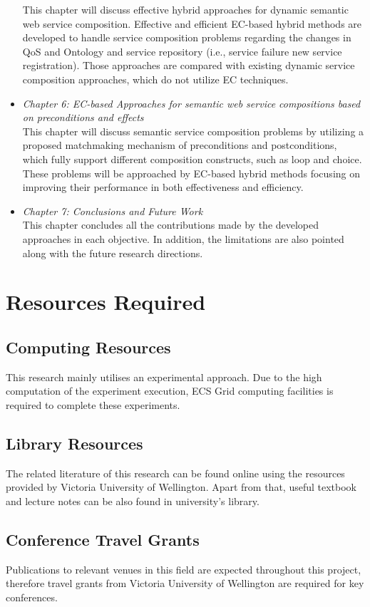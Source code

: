 \begin{itemize}
This chapter will discuss effective hybrid approaches for dynamic semantic web service composition. Effective and efficient EC-based hybrid methods are developed to handle service composition problems regarding the changes in QoS and Ontology and service repository (i.e., service failure new service registration). Those approaches are compared with existing dynamic service composition approaches, which do not utilize EC techniques.
 \item \textit{Chapter 6: EC-based Approaches for semantic web service compositions based on preconditions and effects}\\
This chapter will discuss semantic service composition problems by utilizing a proposed matchmaking mechanism of preconditions and postconditions, which fully support different composition constructs, such as loop and choice. These problems will be approached by EC-based hybrid methods focusing on improving their performance in both effectiveness and efficiency.
 \item \textit{Chapter 7: Conclusions and Future Work}\\
This chapter concludes all the contributions made by the developed approaches in each objective. In addition, the limitations are also pointed along with the future research directions.
\end{itemize}


\section{Resources Required}

\subsection{Computing Resources}
This research mainly utilises an experimental approach. Due to the high computation of the experiment execution, ECS Grid computing facilities is required to complete these experiments.

\subsection{Library Resources}
The related literature of this research can be found online using the resources provided by Victoria University of Wellington. Apart from that, useful textbook and lecture notes can be also found in university's library.

\subsection{Conference Travel Grants}
Publications to relevant venues in this field are expected throughout this project, therefore travel grants from Victoria University of Wellington are required for key conferences.